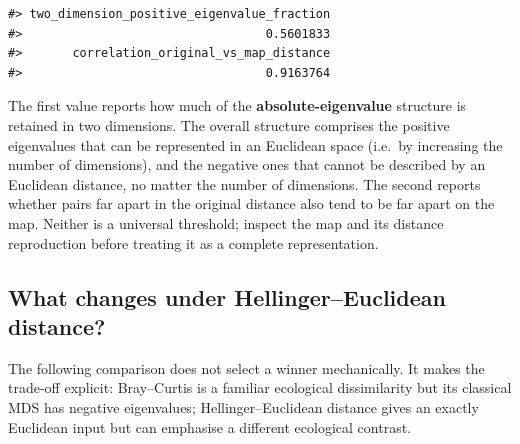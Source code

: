 \documentclass[
  english,
]{article}
\newenvironment{Shaded}{\begin{snugshade}}{\end{snugshade}}
\newcommand{\AttributeTok}[1]{\textcolor[rgb]{0.13,0.29,0.53}{#1}}
\newcommand{\DecValTok}[1]{\textcolor[rgb]{0.00,0.00,0.81}{#1}}
\newcommand{\FunctionTok}[1]{\textcolor[rgb]{0.13,0.29,0.53}{\textbf{#1}}}
\newcommand{\NormalTok}[1]{#1}
\newcommand{\OtherTok}[1]{\textcolor[rgb]{0.56,0.35,0.01}{#1}}
\newcommand{\SpecialCharTok}[1]{\textcolor[rgb]{0.81,0.36,0.00}{\textbf{#1}}}
\begin{document}
\begin{Shaded}
\end{Shaded}

\begin{verbatim}
#> two_dimension_positive_eigenvalue_fraction 
#>                                  0.5601833 
#>       correlation_original_vs_map_distance 
#>                                  0.9163764
\end{verbatim}

The first value reports how much of the \textbf{absolute-eigenvalue}
structure is retained in two dimensions. The overall structure comprises
the positive eigenvalues that can be represented in an Euclidean space
(i.e.~by increasing the number of dimensions), and the negative ones
that cannot be described by an Euclidean distance, no matter the number
of dimensions. The second reports whether pairs far apart in the
original distance also tend to be far apart on the map. Neither is a
universal threshold; inspect the map and its distance reproduction
before treating it as a complete representation.

\subsection{What changes under Hellinger--Euclidean
distance?}\label{what-changes-under-hellingereuclidean-distance}

The following comparison does not select a winner mechanically. It makes
the trade-off explicit: Bray--Curtis is a familiar ecological
dissimilarity but its classical MDS has negative eigenvalues;
Hellinger--Euclidean distance gives an exactly Euclidean input but can
emphasise a different ecological contrast.
\end{document}
